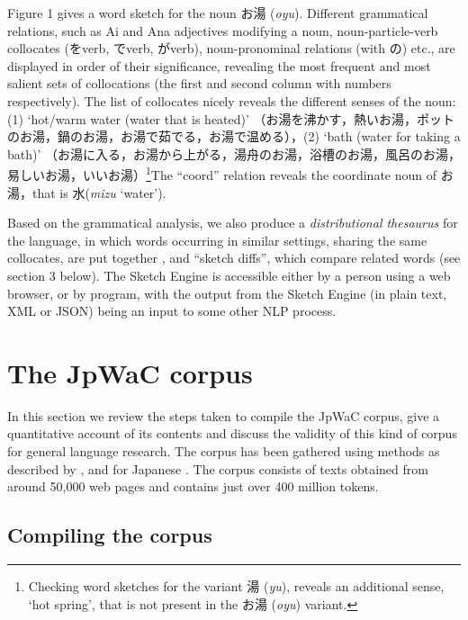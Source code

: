 \documentclass[english]{jnlp_1.4}
\begin{document}
Figure 1 gives a word sketch for the noun お湯
(\textit{oyu}). Different grammatical relations, such as Ai and Ana
adjectives modifying a noun, noun-particle-verb collocates
(をverb, でverb, がverb), noun-pronominal relations
(with の) etc., are displayed in order of their significance,
revealing the most frequent and most salient sets of collocations (the
first and second column with numbers respectively). The list of
collocates nicely reveals the different senses of the noun: (1)
`hot/warm water (water that is heated)'
（お湯を沸かす，熱いお湯，ポットのお湯，鍋のお湯，お湯で茹でる，お湯で温める），(2) `bath (water for taking a
bath)' （お湯に入る，お湯から上がる，湯舟のお湯，浴槽のお湯，風呂のお湯，易しいお湯，いいお湯）\footnote{
	Checking word sketches for the
variant 湯 (\textit{yu}), reveals an additional sense, `hot
spring', that is not present in the お湯 (\textit{oyu})
variant.
}The ``coord'' relation reveals the coordinate noun of お湯，that is 水(\textit{mizu} `water').

Based on the grammatical analysis, we also produce a
\textit{distributional thesaurus} for the language, in which words
occurring in similar settings, sharing the same collocates, are put
together , 
and ``sketch diffs'', which compare related words (see
section 3 below). The Sketch Engine is accessible either by a person
using a web browser, or by program, with the output from the Sketch
Engine (in plain text, XML or JSON) being an input to some other NLP
process.




\section{The JpWaC corpus}

In this section we review the steps taken to compile the JpWaC corpus,
give a quantitative account of its contents and discuss the validity
of this kind of corpus for general language research. The corpus has
been gathered using methods as described by
, and for Japanese
. The corpus consists of texts obtained from around
50,000 web pages and contains just over 400 million tokens.


\subsection{Compiling the corpus}
\end{document}
